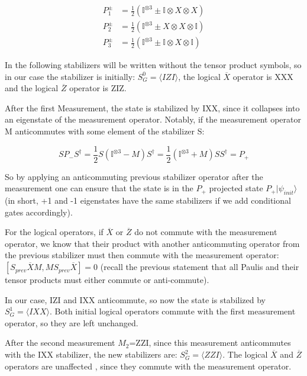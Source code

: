 \begin{align}
	P^{\pm}_{1} &= \frac{1}{2}\left(\mathbb{I}^{\otimes 3} \pm 
	\mathbb{I}\otimes X \otimes X\right) \\
	P^{\pm}_{2} & = \frac{1}{2} \left(\mathbb{I}^{\otimes 3} \pm
	X \otimes X \otimes \mathbb{I}\right) \\
	P^{\pm}_{3} &= \frac{1}{2} \left(\mathbb{I}^{\otimes 3} \pm
	\mathbb{I} \otimes X \otimes \mathbb{I}\right)
\end{align}

In the following stabilizers
will be written without the tensor product symbols, so in 
our case the stabilizer is initially: $S_{G}^{0}= \langle IZI \rangle$,
the logical $\overline{X}$ operator is XXX and the logical
$\overline{Z}$ operator is ZIZ.

After the first Measurement, the state is stabilized by 
IXX, since it collapses into an eigenstate of the measurement 
operator. Notably, if the measurement operator M anticommutes
with some element of the stabilizer S:

\begin{equation}
	SP_{-}S^{\dagger} = \frac{1}{2}S\left( 
	\mathbb{I}^{\otimes 3} - M \right) S^{\dagger}
	= \frac{1}{2} \left( \mathbb{I}^{\otimes 3} + M \right)
	SS^{\dagger} = P_{+}
\end{equation}

So by applying an anticommuting previous stabilizer operator
after the measurement one can ensure that the state is in the
$P_{+}$ projected state $P_{+}|\psi_{init}\rangle$ (in short,
+1 and -1 eigenstates have the same stabilizers if we add 
conditional gates accordingly).

For the logical operators, if $\overline{X}$ or $\overline{Z}$
do not commute with the measurement operator, we know that their
product with another anticommuting operator from the previous
stabilizer must then commute with the measurement operator: 
$[S_{prev}\overline{X}M, MS_{prev}\overline{X}]=0$ (recall the
previous statement that all Paulis and their tensor products must
either commute or anti-commute).

In our case, IZI and IXX anticommute,
so now the state is stabilized by $S^{1}_{G} = \langle IXX
\rangle$. Both initial logical operators commute with the first
measurement operator, so they are left unchanged.

After the second measurement $M_{2}$=ZZI, since this
measurement anticommutes with the IXX stabilizer, the new 
stabilizers are: $S^{2}_{G}=\langle ZZI \rangle$. The logical 
$\overline{X}$ and $\overline{Z}$ operators are unaffected
, since they commute with the measurement operator.

